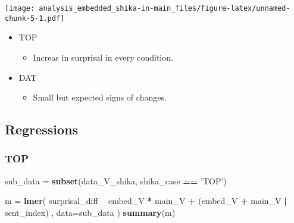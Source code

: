 \documentclass[]{ltjsarticle}
\newenvironment{Shaded}{\begin{snugshade}}{\end{snugshade}}
\newcommand{\KeywordTok}[1]{\textcolor[rgb]{0.13,0.29,0.53}{\textbf{#1}}}
\newcommand{\DataTypeTok}[1]{\textcolor[rgb]{0.13,0.29,0.53}{#1}}
\newcommand{\StringTok}[1]{\textcolor[rgb]{0.31,0.60,0.02}{#1}}
\newcommand{\OperatorTok}[1]{\textcolor[rgb]{0.81,0.36,0.00}{\textbf{#1}}}
\newcommand{\NormalTok}[1]{#1}
\providecommand{\tightlist}{%
  \setlength{\itemsep}{0pt}\setlength{\parskip}{0pt}}
\begin{document}
\texttt{[image: analysis\_embedded\_shika-in-main\_files/figure-latex/unnamed-chunk-5-1.pdf]}

\begin{itemize}
\tightlist
\item
  TOP

  \begin{itemize}
  \tightlist
  \item
    Increas in surprisal in every condition.
  \end{itemize}
\item
  DAT

  \begin{itemize}
  \tightlist
  \item
    Small but expected signs of changes.
  \end{itemize}
\end{itemize}

\subsection{Regressions}\label{regressions-1}

\subsubsection{TOP}\label{top-1}

\begin{Shaded}
\begin{Highlighting}[]
\NormalTok{sub_data =}\StringTok{ }\KeywordTok{subset}\NormalTok{(data_V_shika, shika_case }\OperatorTok{==}\StringTok{ 'TOP'}\NormalTok{)}

\NormalTok{m =}\StringTok{ }\KeywordTok{lmer}\NormalTok{(}
\NormalTok{        surprisal_diff}
            \OperatorTok{~}\StringTok{ }\NormalTok{embed_V }\OperatorTok{*}\StringTok{ }\NormalTok{main_V}
                \OperatorTok{+}\StringTok{ }\NormalTok{(embed_V }\OperatorTok{+}\StringTok{ }\NormalTok{main_V }\OperatorTok{|}\StringTok{ }\NormalTok{sent_index)}
\NormalTok{        ,}
        \DataTypeTok{data=}\NormalTok{sub_data}
\NormalTok{        )}
\KeywordTok{summary}\NormalTok{(m)}
\end{Highlighting}
\end{Shaded}
\end{document}
